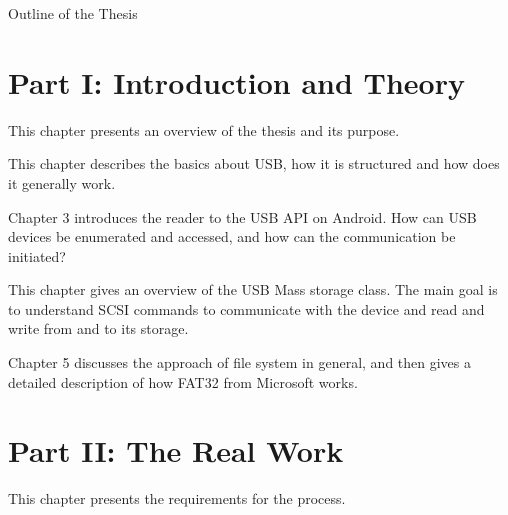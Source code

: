 \clearemptydoublepage

{}

\begin{center}
	\huge{Outline of the Thesis}
\end{center}




\section*{Part I: Introduction and Theory}

  \vspace{1mm}

\noindent  This chapter presents an overview of the thesis and its purpose. \\

  \vspace{1mm}

\noindent  This chapter describes the basics about USB, how it is structured and how does it generally work.   \\

  \vspace{1mm}

\noindent  Chapter 3 introduces the reader to the USB API on Android. How can USB devices be enumerated and accessed, and how can the communication be initiated? \\

  \vspace{1mm}

\noindent  This chapter gives an overview of the USB Mass storage class. The main goal is to understand SCSI commands to communicate with the device and read and write from and to its storage. \\

  \vspace{1mm}

\noindent  Chapter 5 discusses the approach of file system in general, and then gives a detailed description of how FAT32 from Microsoft works. \\

\section*{Part II: The Real Work}

  \vspace{1mm}

\noindent  This chapter presents the requirements for the process.